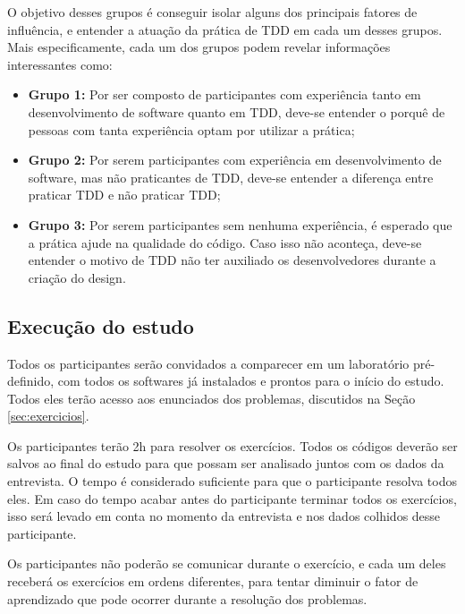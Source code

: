 O objetivo desses grupos é conseguir isolar alguns dos principais fatores de influência,
e entender a atuação da prática de TDD em cada um desses grupos. Mais especificamente,
cada um dos grupos podem revelar informações interessantes como:

\begin{itemize}
	\item \textbf{Grupo 1:} Por ser composto de participantes com experiência tanto
	em desenvolvimento de software quanto em TDD, deve-se entender o porquê de
	pessoas com tanta experiência optam por utilizar a prática;
	
	\item \textbf{Grupo 2:} Por serem participantes com experiência em desenvolvimento
	de software, mas não praticantes de TDD, deve-se entender a diferença entre
	praticar TDD e não praticar TDD;
		
	\item \textbf{Grupo 3:} Por serem participantes sem nenhuma experiência, é esperado que
	a prática ajude na qualidade do código. Caso isso não aconteça, deve-se entender o motivo de TDD
	não ter auxiliado os desenvolvedores durante a criação do design.
\end{itemize}

\subsection{Execução do estudo}
\label{sec:execucao}	

Todos os participantes serão convidados a comparecer em um laboratório pré-definido,
com todos os softwares já instalados e prontos para o início do estudo. Todos eles
terão acesso aos enunciados dos problemas, discutidos na
Seção \ref{sec:exercicios}.

Os participantes terão 2h para resolver os exercícios. 
Todos os códigos deverão ser salvos ao final do estudo para que possam ser analisado juntos
com os dados da entrevista.
O tempo é considerado suficiente
para que o participante resolva todos eles. Em caso do tempo acabar antes do participante
terminar todos os exercícios, isso será levado em conta no momento da entrevista e nos
dados colhidos desse participante.

Os participantes não poderão se comunicar durante o exercício, e cada um deles receberá
os exercícios em ordens diferentes, para tentar diminuir o fator de aprendizado que 
pode ocorrer durante a resolução dos problemas. 

